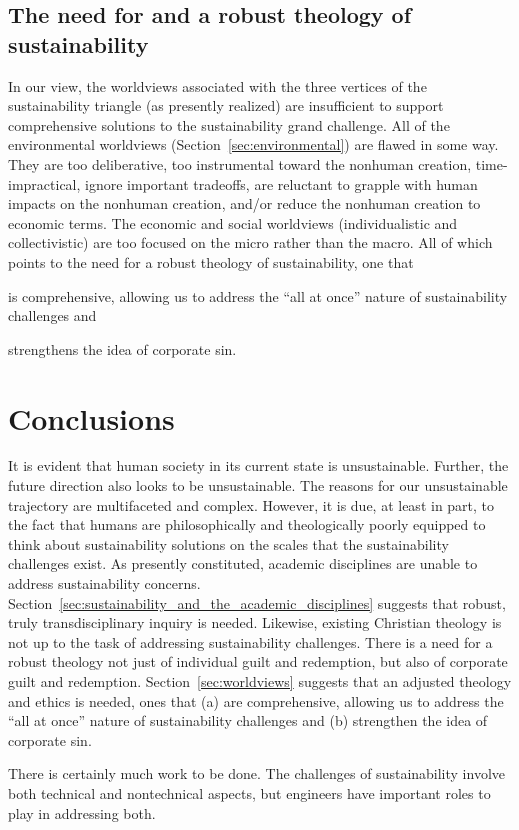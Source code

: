 \documentclass[12pt]{article}
\begin{document}
\subsection{The need for and a robust theology of sustainability}
\label{sec:needs}

In our view,
the worldviews associated with the three vertices of the sustainability triangle
(as presently realized) 
are insufficient to support comprehensive solutions to the sustainability grand challenge.
All of the environmental worldviews (Section~\ref{sec:environmental})
are flawed in some way. They are
too deliberative, too instrumental toward the nonhuman creation,
time-impractical, 
ignore important tradeoffs, 
are reluctant to grapple with human impacts on the nonhuman creation, and/or
reduce the nonhuman creation to economic terms.
The economic and social worldviews (individualistic and collectivistic) 
are too focused on the micro rather than the macro.
All of which points to the need for a robust theology of sustainability, 
one that 
%
\begin{enumerate*}[label={(\alph*)}]

  \item is comprehensive, allowing us to address the ``all at once'' nature of sustainability challenges and

  \item strengthens the idea of corporate sin.
  
\end{enumerate*}


\section{Conclusions}
\label{sec:conclusions}

It is evident that human society in its current state is unsustainable. 
Further, the future direction also looks to be unsustainable. 
The reasons for our unsustainable trajectory are multifaceted and complex.
However, it is due, at least in part, 
to the fact that humans are philosophically and theologically
poorly equipped to think about sustainability solutions 
on the scales that the sustainability challenges exist. 
As presently constituted, academic disciplines are unable to address sustainability concerns. 
Section~\ref{sec:sustainability_and_the_academic_disciplines} suggests that 
robust, truly transdisciplinary inquiry is needed.
Likewise, existing Christian theology is not up to the task of addressing sustainability challenges.
There is a need for a robust theology not just of individual guilt and redemption, but also of 
corporate guilt and redemption.
Section~\ref{sec:worldviews} suggests that an adjusted 
theology and ethics is needed, ones that 
(a) are comprehensive, allowing us to address the “all at once” nature of sustainability challenges and 
(b) strengthen the idea of corporate sin.

There is certainly much work to be done.
The challenges of sustainability involve both technical and nontechnical aspects,
but engineers have important roles to play in addressing both. 


\printbibliography
\end{document}
